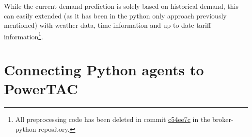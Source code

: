While the current demand prediction is solely based on historical demand, this can easily extended (as it has been in
the python only approach previously mentioned) with weather data, time information and up-to-date tariff information\footnote{All preprocessing code has been deleted in commit
    \href{https://github.com/pascalwhoop/broker-python/commit/c54ee7c05585d15462f40e2be6850343e8aea27a}{c54ee7c} in the
broker-python repository.}.



%
%


\section{Connecting Python agents to PowerTAC}%
\label{sec:connecting_python_agents_to_powertac}



